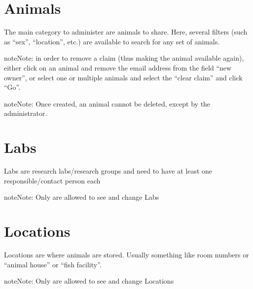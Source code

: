 \documentclass[letterpaper,10pt,openany,oneside,english]{sphinxmanual}
\begin{document}
\section{Animals}
\label{\detokenize{index:id5}}
The main category to administer are animals to share.
Here, several filters (such as “sex”, “location”, etc.) are available to search for any set of animals.

\noindent{}

\begin{sphinxadmonition}{note}{Note:}
in order to remove a claim (thus making the animal available again), either click on an animal
and remove the email address from the field “new owner”, or select one or multiple animals and
select the “clear claim”  and click “Go”.
\end{sphinxadmonition}

\begin{sphinxadmonition}{note}{Note:}
Once created, an animal cannot be deleted, except by the administrator.
\end{sphinxadmonition}


\section{Labs}
\label{\detokenize{index:labs}}
Labs are research labs/research groups and need to have at least one responsible/contact person each

\noindent{}

\begin{sphinxadmonition}{note}{Note:}
Only  are allowed to see and change Labs
\end{sphinxadmonition}


\section{Locations}
\label{\detokenize{index:locations}}
Locations are where animals are stored. Usually something like room numbers or “animal house” or “fish facility”.

\noindent{}

\begin{sphinxadmonition}{note}{Note:}
Only  are allowed to see and change Locations
\end{sphinxadmonition}
\end{document}
